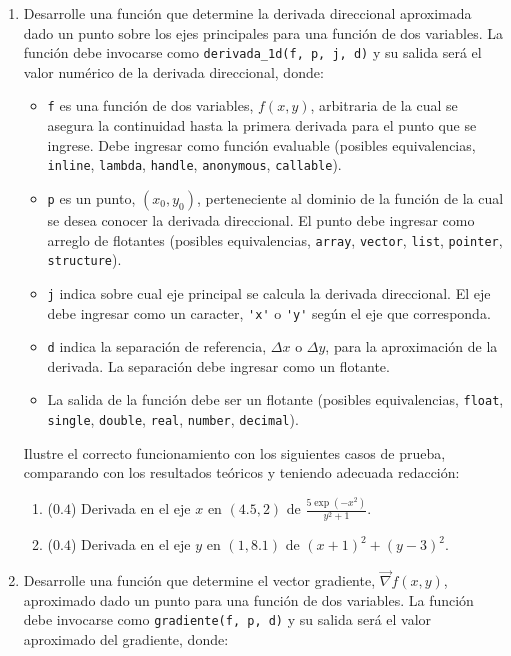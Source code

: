 \documentclass[12pt]{article}
\begin{document}
  \begin{enumerate}[leftmargin=*,widest=9]
    \item Desarrolle una función que determine la derivada direccional aproximada dado un punto sobre los ejes principales para una función de dos variables. La función debe invocarse como \verb-derivada_1d(f, p, j, d)- y su salida será el valor numérico de la derivada direccional, donde:
    \begin{itemize}
        \item \verb-f- es una función de dos variables, \(f(x,y)\), arbitraria de la cual se asegura la continuidad hasta la primera derivada para el punto que se ingrese. Debe ingresar como función evaluable (posibles equivalencias, \verb-inline-, \verb-lambda-, \verb-handle-, \verb-anonymous-, \verb-callable-).
    \item \verb-p- es un punto, \((x_0,y_0)\), perteneciente al dominio de la función de la cual se desea conocer la derivada direccional. El punto debe ingresar como arreglo de flotantes (posibles equivalencias, \verb-array-, \verb-vector-, \verb-list-, \verb-pointer-, \verb-structure-).
    \item \verb-j- indica sobre cual eje principal se calcula la derivada direccional. El eje debe ingresar como un caracter, \verb-'x'- o \verb-'y'- según el eje que corresponda.
    \item \verb-d- indica la separación de referencia, \(\Delta x\) o \(\Delta y\), para la aproximación de la derivada. La separación debe ingresar como un flotante.
    \item La salida de la función debe ser un flotante (posibles equivalencias, \verb-float-, \verb-single-, \verb-double-, \verb-real-, \verb-number-, \verb-decimal-).
    \end{itemize}
Ilustre el correcto funcionamiento con los siguientes casos de prueba, comparando con los resultados teóricos y teniendo adecuada redacción:
   \begin{enumerate}[label=\alph*]
    \item ($0.4$) Derivada en el eje \(x\) en \((4.5, 2)\) de {\large \(\frac{5\exp(-x^2)}{y^2+1}\)}.
    \item ($0.4$) Derivada en el eje \(y\) en \((1, 8.1)\) de \((x+1)^2 + (y-3)^2\).
   \end{enumerate}
    \item Desarrolle una función que determine el vector gradiente, \(\vec{\nabla} f(x,y)\), aproximado dado un punto para una función de dos variables. La función debe invocarse como \verb-gradiente(f, p, d)- y su salida será el valor aproximado del gradiente, donde:

\end{enumerate}
\end{document}
